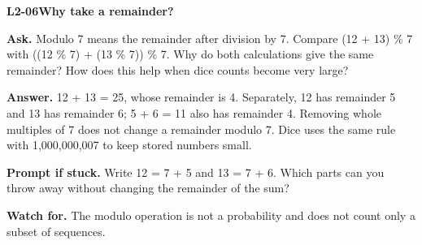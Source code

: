 \documentclass[11pt,a4paper]{article}
\begin{document}
\noindent\begin{minipage}{\textwidth}
{\color{teal}\textbf{L2-06}}\quad \textbf{Why take a remainder?}\par\smallskip
\textbf{Ask.} Modulo 7 means the remainder after division by 7. Compare (12 + 13) \% 7 with ((12 \% 7) + (13 \% 7)) \% 7. Why do both calculations give the same remainder? How does this help when dice counts become very large?\par\smallskip
\textbf{Answer.} 12 + 13 = 25, whose remainder is 4. Separately, 12 has remainder 5 and 13 has remainder 6; 5 + 6 = 11 also has remainder 4. Removing whole multiples of 7 does not change a remainder modulo 7. Dice uses the same rule with 1,000,000,007 to keep stored numbers small.\par\smallskip
\textbf{Prompt if stuck.} Write 12 = 7 + 5 and 13 = 7 + 6. Which parts can you throw away without changing the remainder of the sum?\par\smallskip
\textbf{Watch for.} The modulo operation is not a probability and does not count only a subset of sequences.
\end{minipage}\par{}\medskip
\end{document}
